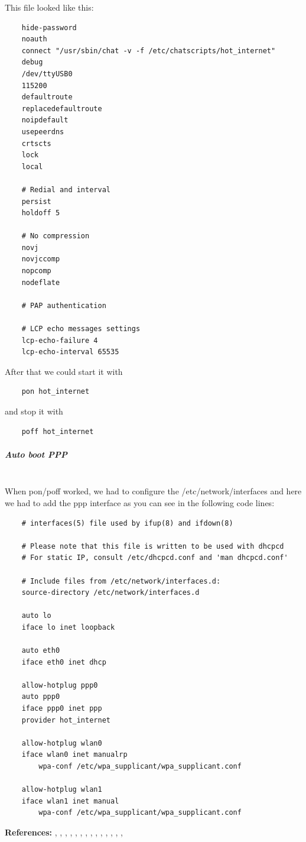 This file looked like this:
\begin{verbatim}
	hide-password
	noauth
	connect "/usr/sbin/chat -v -f /etc/chatscripts/hot_internet"
	debug
	/dev/ttyUSB0
	115200
	defaultroute
	replacedefaultroute
	noipdefault
	usepeerdns
	crtscts
	lock
	local
	 
	# Redial and interval
	persist
	holdoff 5
	 
	# No compression
	novj
	novjccomp
	nopcomp
	nodeflate
		 
	# PAP authentication
	 
	# LCP echo messages settings
	lcp-echo-failure 4
	lcp-echo-interval 65535
\end{verbatim}
After that we could start it with 
\begin{verbatim}
	pon hot_internet
\end{verbatim}
and stop it with 
\begin{verbatim}
	poff hot_internet
\end{verbatim}
\subparagraph{Auto boot PPP}\mbox{}\\
When pon/poff worked, we had to configure the /etc/network/interfaces and here we had to add the ppp interface as you can see in the following code lines:
\begin{verbatim}
	# interfaces(5) file used by ifup(8) and ifdown(8)
	 
	# Please note that this file is written to be used with dhcpcd
	# For static IP, consult /etc/dhcpcd.conf and 'man dhcpcd.conf'
 
	# Include files from /etc/network/interfaces.d:
	source-directory /etc/network/interfaces.d
	 
	auto lo
	iface lo inet loopback
	 
	auto eth0
	iface eth0 inet dhcp
	 
	allow-hotplug ppp0
	auto ppp0
	iface ppp0 inet ppp
	provider hot_internet
	 
	allow-hotplug wlan0
	iface wlan0 inet manualrp
	    wpa-conf /etc/wpa_supplicant/wpa_supplicant.conf
	 
	allow-hotplug wlan1
	iface wlan1 inet manual
	    wpa-conf /etc/wpa_supplicant/wpa_supplicant.conf
\end{verbatim}
\textbf{References:} \cite{gpsd}, \cite{USBModeSwitch}, \cite{GSMmobile}, \cite{USBModemStickMedion}, \cite{PPPunderUbuntu}, \cite{USBSurfstick}, \cite{Reboot}, \cite{DaemonizeJavaApplications}, \cite{raspberrypi}, \cite{Tastaturlayout}, \cite{TightVNCServer}, \cite{RaspberryPiGPS}, \cite{gpsbable}, \cite{autostartScript}, \cite{wlan}
\clearpageauthor
\newpage
